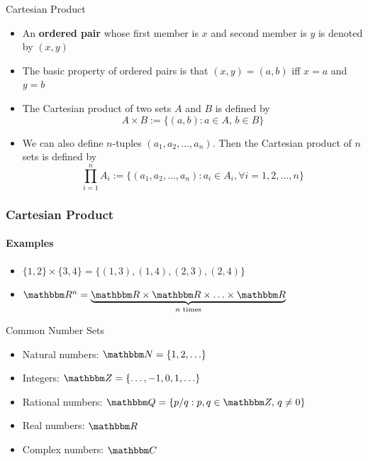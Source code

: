 \documentclass[9pt,aspectratio=169]{beamer}
\newcommand{\RR}{\mathbbm R}
\newcommand{\CC}{\mathbbm C}
\newcommand{\QQ}{\mathbbm Q}
\newcommand{\NN}{\mathbbm N}
\newcommand{\ZZ}{\mathbbm Z}
\begin{document}
\begin{frame}[allowframebreaks]{Cartesian Product}
    \begin{definition}
        \begin{itemize}
            \item An \textbf{ordered pair} whose first member is $x$ and
            second member is $y$ is denoted by $(x, y)$
            \item The basic property of ordered pairs is that $(x, y) = (a,
            b)$ iff $x = a$ and $y = b$
            \item The Cartesian product of two sets $A$ and $B$ is defined by
            \begin{equation*}
                A \times B := \{(a, b): a\in A,\, b\in B\}
            \end{equation*}
            \item We can also define $n$-tuples $(a_1, a_2, \ldots, a_n)$.
            Then the Cartesian product of $n$ sets is defined by
            \begin{equation*}
                \prod_{i=1}^n A_i := \{(a_1, a_2, \ldots, a_n): a_i \in A_i,
                \forall i = 1, 2, \ldots, n\}
            \end{equation*}
        \end{itemize}
    \end{definition}
\end{frame}

\begin{frame}
    \frametitle{Cartesian Product}
    \framesubtitle{Examples}
    \begin{itemize}
        \item $\{1, 2\} \times \{3, 4\} = \{(1, 3), (1, 4), (2, 3), (2, 4)\}$
        \item $\RR^n = \underbrace{\RR \times \RR \times \ldots \times
          \RR}_{n \text{ times}}$ 
    \end{itemize}
\end{frame}

\begin{frame}{Common Number Sets}
    \begin{itemize}
        \item Natural numbers: $\NN = \{1, 2, \ldots\}$
        \item Integers: $\ZZ = \{\ldots, -1, 0, 1, \ldots\}$
        \item Rational numbers: $\QQ = \{p/q: p, q \in \ZZ,\, q \neq 0\}$
        \item Real numbers: $\RR$
        \item Complex numbers: $\CC$
    \end{itemize}
\end{frame}
\end{document}
